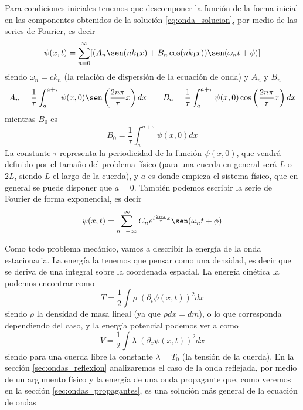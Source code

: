 \documentclass[a4paper]{article}
\numberwithin{equation}{section}
\begin{document}
			Para condiciones iniciales tenemos que descomponer la función de la forma inicial en las componentes obtenidos de la solución \ref{eq:onda_solucion}, por medio de las series de Fourier, es decir
			\begin{equation}
				\psi(x,t) = \sum_{n=0}^{\infty} [(A_n \sen(n k_1 x) + B_n \cos(n k_1 x) ) \sen(\omega_n t + \phi)]
				\label{eq:onda_solucion_fourier}
			\end{equation}
			siendo $\omega_n = c k_n$ (la relación de dispersión de la ecuación de onda) y $A_n$ y $B_n$
			\begin{equation}
				A_n = \frac{1}{\tau} \int_{a}^{a + \tau} \psi(x,0) \sen\left(\frac{2 n\pi}{\tau} x\right) dx \qquad B_n = \frac{1}{\tau} \int_{a}^{a + \tau} \psi(x,0) \cos\left(\frac{2 n \pi}{\tau} x\right) dx
			\end{equation}
			mientras $B_0$ es
			\begin{equation}
				B_0  = \frac{1}{\tau} \int_{a}^{a + \tau} \psi(x,0) dx
			\end{equation}
			La constante $\tau$ representa la periodicidad de la función $\psi(x,0)$, que vendrá definido por el tamaño del problema físico (para una cuerda en general será $L$ o $2L$, siendo $L$ el largo de la cuerda), y $a$ es donde empieza el sistema físico, que en general se puede disponer que $a = 0$. También podemos escribir la serie de Fourier de forma exponencial, es decir
			\begin{equation}
				\psi(x,t) = \sum_{n=-\infty}^{\infty} C_n e^{i \frac{2 n \pi}{\tau} x} \sen(\omega_n t + \phi)
				\label{eq:onda_solucion_fourier_exp}
			\end{equation}
			
			Como todo problema mecánico, vamos a describir la energía de la onda estacionaria. La energía la tenemos que pensar como una densidad, es decir que se deriva de una integral sobre la coordenada espacial. La energía cinética la podemos encontrar como
			\begin{equation}
				T = \frac{1}{2} \int \rho \; (\partial_t \psi(x,t))^2 dx
				\label{eq:ondas_cinetica}
			\end{equation}
			siendo $\rho$ la densidad de masa lineal (ya que $\rho dx = dm$), o lo que corresponda dependiendo del caso, y la energía potencial podemos verla como 
			\begin{equation}
				V = \frac{1}{2} \int \lambda \; (\partial_x \psi(x,t))^2 dx
				\label{eq:ondas_potencial}
			\end{equation}
			siendo para una cuerda libre la constante $\lambda = T_0$ (la tensión de la cuerda). En la sección \ref{sec:ondas_reflexion} analizaremos el caso de la onda reflejada, por medio de un argumento físico y la energía de una onda propagante que, como veremos en la sección \ref{sec:ondas_propagantes}, es una solución más general de la ecuación de ondas
\end{document}
